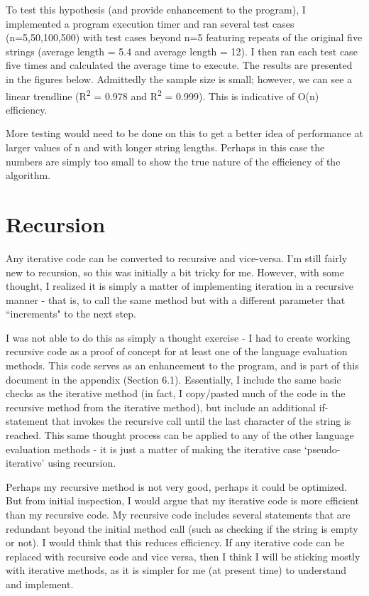 \documentclass[12pt, titlepage]{article}
\begin{document}
To test this hypothesis (and provide enhancement to the program), I implemented a program execution timer and ran several test cases (n=5,50,100,500) with test cases beyond n=5 featuring repeats of the original five strings (average length = 5.4 and average length = 12). I then ran each test case five times and calculated the average time to execute. The results are presented in the figures below. Admittedly the sample size is small; however, we can see a linear trendline (R\textsuperscript{2} = 0.978 and R\textsuperscript{2} = 0.999). This is indicative of O(n) efficiency.

More testing would need to be done on this to get a better idea of performance at larger values of n and with longer string lengths. Perhaps in this case the numbers are simply too small to show the true nature of the efficiency of the algorithm. 

\section{Recursion}

Any iterative code can be converted to recursive and vice-versa. I'm still fairly new to recursion, so this was initially a bit tricky for me. However, with some thought, I realized it is simply a matter of implementing iteration in a recursive manner - that is, to call the same method but with a different parameter that ``increments" to the next step. 

I was not able to do this as simply a thought exercise - I had to create working recursive code as a proof of concept for at least one of the language evaluation methods. This code serves as an enhancement to the program, and is part of this document in the appendix (Section 6.1). Essentially, I include the same basic checks as the iterative method (in fact, I copy/pasted much of the code in the recursive method from the iterative method), but include an additional if-statement that invokes the recursive call until the last character of the string is reached. This same thought process can be applied to any of the other language evaluation methods - it is just a matter of making the iterative case `pseudo-iterative' using recursion.

Perhaps my recursive method is not very good, perhaps it could be optimized. But from initial inspection, I would argue that my iterative code is more efficient than my recursive code. My recursive code includes several statements that are redundant beyond the initial method call (such as checking if the string is empty or not). I would think that this reduces efficiency. If any iterative code can be replaced with recursive code and vice versa, then I think I will be sticking mostly with iterative methods, as it is simpler for me (at present time) to understand and implement. 
\end{document}
